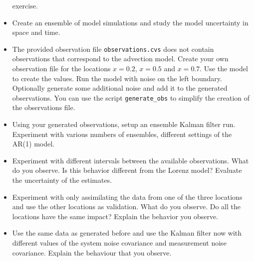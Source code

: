 \documentclass[a4paper,10pt]{article}
\begin{document}
\begin{itemize}
  exercise.
\item Create an ensemble of model simulations and study the model uncertainty
  in space and time.
\item The provided observation file {\tt observations.cvs} does not contain
  observations that correspond to the advection model. Create your own
  observation file for the locations $x=0.2$, $x=0.5$ and $x=0.7$. Use the
  model to create the values. Run the model with noise on the left boundary.
  Optionally generate some additional noise and add it to the generated
  observations. You can use the script {\tt generate\_obs} to simplify the
  creation of the observations file.
\item Using your generated observations, setup an ensemble Kalman filter run.
  Experiment with various numbers of ensembles, different settings of the AR(1)
  model.
\item Experiment with different intervals between the available observations.
  What do you observe. Is this behavior different from the Lorenz model?
  Evaluate the uncertainty of the estimates.
\item Experiment with only assimilating the data from one of the three
  locations and use the other locations as validation. What do you observe. Do
  all the locations have the same impact? Explain the behavior you observe.
\item Use the same data as generated before and use the Kalman filter now with
  different values of the system noise covariance and measurement noise
  covariance. Explain the behaviour that you observe.
\end{itemize}
\end{document}

